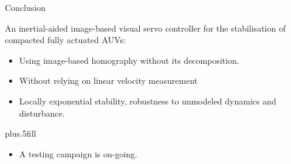 \documentclass{beamer}
\begin{document}
\begin{frame}{Conclusion}

  An inertial-aided image-based visual servo controller for the stabilisation of compacted fully actuated AUVs:
  \begin{itemize}
  \item
    Using image-based homography without its decomposition.
  \item
    Without relying on linear velocity measurement
  \item
    Locally exponential stability, robustness to unmodeled dynamics and disturbance.
  \end{itemize}
  
  \vskip0pt plus.5fill
  \begin{itemize}
  \item
    A testing campaign is on-going.    
  \end{itemize}
\end{frame}


\begin{frame}

\end{frame}



%
%    
%    
%
% 
%    
%
\end{document}

